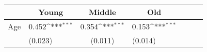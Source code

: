 {
\def\sym#1{\ifmmode^{#1}\else\(^{#1}\)\fi}
\begin{tabular*}{.6\hsize}{@{\hskip\tabcolsep\extracolsep\fill}l*{3}{lc}}
\toprule
                &\multicolumn{1}{c}{Young}&\multicolumn{1}{c}{Middle}&\multicolumn{1}{c}{Old}\\
\midrule
Age \hspace{2ex}&    0.452\sym{***}&    0.354\sym{***}&    0.153\sym{***}\\
                &  (0.023)         &  (0.011)         &  (0.014)         \\
\bottomrule
\end{tabular*}
}
